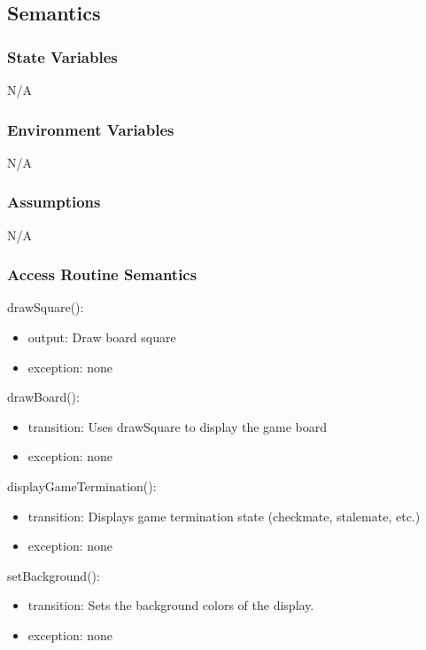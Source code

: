 \documentclass[12pt, titlepage]{article}
\begin{document}
    \subsection{Semantics}
    \subsubsection{State Variables}
    N/A

    \subsubsection{Environment Variables}
    N/A

    \subsubsection{Assumptions}
    N/A

    \subsubsection{Access Routine Semantics}
        \noindent drawSquare():
        \begin{itemize}
            \item output: Draw board square
            \item exception: none
        \end{itemize}

        \noindent drawBoard():
        \begin{itemize}
            \item transition: Uses drawSquare to display the game board
            \item exception: none
        \end{itemize}

        \noindent displayGameTermination():
        \begin{itemize}
            \item transition: Displays game termination state (checkmate, stalemate, etc.)
            \item exception: none
        \end{itemize}

        \noindent setBackground():
        \begin{itemize}
            \item transition: Sets the background colors of the display.
            \item exception: none
        \end{itemize}
\end{document}
